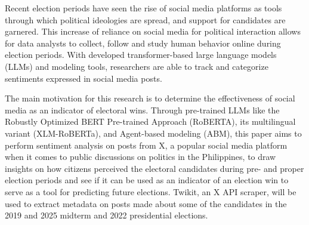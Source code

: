 \begin{thesisabstract}
Recent election periods have seen the rise of social media platforms as tools through which political ideologies are spread, and support for candidates are garnered. This increase of reliance on social media for political interaction allows for data analysts to collect, follow and study human behavior online during election periods. With developed transformer-based large language models (LLMs) and modeling tools, researchers are able to track and categorize sentiments expressed in social media posts.

The main motivation for this research is to determine the effectiveness of social media as an indicator of electoral wins. Through pre-trained LLMs like the Robustly Optimized BERT Pre-trained Approach (RoBERTA), its multilingual variant (XLM-RoBERTa), and Agent-based modeling (ABM), this paper aims to perform sentiment analysis on posts from X, a popular social media platform when it comes to public discussions on politics in the Philippines, to draw insights on how citizens perceived the electoral candidates during pre- and proper election periods and see if it can be used as an indicator of an election win to serve as a tool for predicting future elections. Twikit, an X API scraper, will be used to extract metadata on posts made about some of the candidates in the 2019 and 2025 midterm and 2022 presidential elections.
\end{thesisabstract}